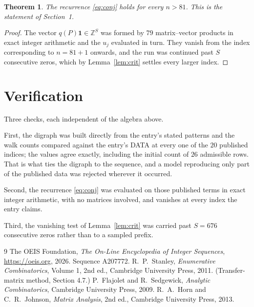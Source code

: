 \documentclass[11pt,a4paper]{article}
\theoremstyle{plain}
\newtheorem{theorem}{Theorem}
\theoremstyle{definition}
\begin{document}
\begin{theorem}
The recurrence \eqref{eq:conj} holds for every $n>81$. This is the statement of
Section~1.
\end{theorem}

\begin{proof}
The vector $q(P)\mathbf{1}\in\mathbb{Z}^{S}$ was formed by $79$ matrix--vector
products in exact integer arithmetic and the $u_j$ evaluated in turn. They vanish from the
index corresponding to $n=81+1$ onwards, and the run was continued past $S$ consecutive
zeros, which by Lemma~\ref{lem:crit} settles every larger index.
\end{proof}

\section{Verification}

Three checks, each independent of the algebra above.

First, the digraph was built directly from the entry's stated patterns and the walk counts
compared against the entry's DATA at every one of the $20$ published indices; the
values agree exactly, including the initial count of $26$ admissible rows. That is
what ties the digraph to the sequence, and a model reproducing only part of the published
data was rejected wherever it occurred.

Second, the recurrence \eqref{eq:conj} was evaluated on those published terms in exact
integer arithmetic, with no matrices involved, and vanishes at every index the entry claims.

Third, the vanishing test of Lemma~\ref{lem:crit} was carried past $S=676$ consecutive
zeros rather than to a sampled prefix.

\begin{thebibliography}{9}
 The OEIS Foundation, \emph{The On-Line Encyclopedia of Integer
Sequences}, \url{https://oeis.org}, 2026. Sequence A207772.
 R.~P.~Stanley, \emph{Enumerative Combinatorics}, Volume 1, 2nd ed.,
Cambridge University Press, 2011. (Transfer-matrix method, Section 4.7.)
 P.~Flajolet and R.~Sedgewick, \emph{Analytic Combinatorics}, Cambridge
University Press, 2009.
 R.~A.~Horn and C.~R.~Johnson, \emph{Matrix Analysis}, 2nd ed., Cambridge
University Press, 2013.
\end{thebibliography}
\end{document}
